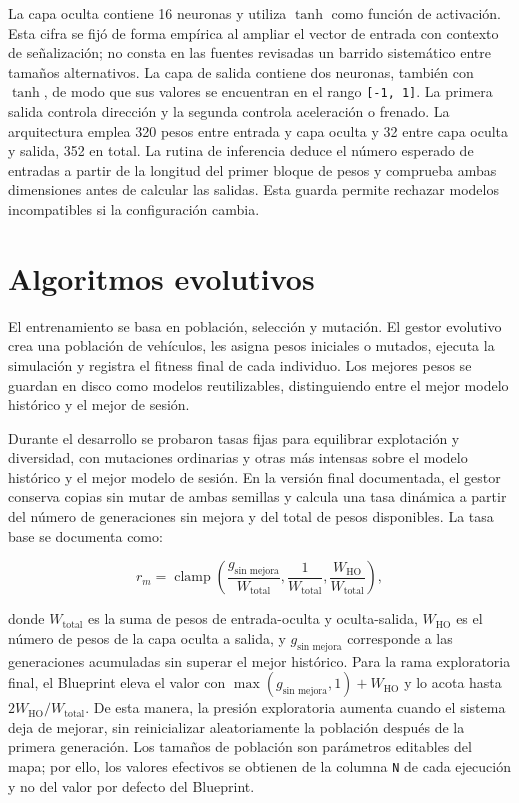La capa oculta contiene 16 neuronas y utiliza \(\tanh\) como función de activación. Esta cifra se fijó de forma empírica al ampliar el vector de entrada con contexto de señalización; no consta en las fuentes revisadas un barrido sistemático entre tamaños alternativos. La capa de salida contiene dos neuronas, también con \(\tanh\), de modo que sus valores se encuentran en el rango \texttt{[-1, 1]}. La primera salida controla dirección y la segunda controla aceleración o frenado. La arquitectura emplea 320 pesos entre entrada y capa oculta y 32 entre capa oculta y salida, 352 en total. La rutina de inferencia deduce el número esperado de entradas a partir de la longitud del primer bloque de pesos y comprueba ambas dimensiones antes de calcular las salidas. Esta guarda permite rechazar modelos incompatibles si la configuración cambia.

\section{Algoritmos evolutivos}

El entrenamiento se basa en población, selección y mutación. El gestor evolutivo crea una población de vehículos, les asigna pesos iniciales o mutados, ejecuta la simulación y registra el fitness final de cada individuo. Los mejores pesos se guardan en disco como modelos reutilizables, distinguiendo entre el mejor modelo histórico y el mejor de sesión.

Durante el desarrollo se probaron tasas fijas para equilibrar explotación y diversidad, con mutaciones ordinarias y otras más intensas sobre el modelo histórico y el mejor modelo de sesión. En la versión final documentada, el gestor conserva copias sin mutar de ambas semillas y calcula una tasa dinámica a partir del número de generaciones sin mejora y del total de pesos disponibles. La tasa base se documenta como:

\begin{equation}
r_m=\operatorname{clamp}\left(\frac{g_{\text{sin mejora}}}{W_{\text{total}}},\frac{1}{W_{\text{total}}},\frac{W_{\text{HO}}}{W_{\text{total}}}\right),
\end{equation}

donde \(W_{\text{total}}\) es la suma de pesos de entrada-oculta y oculta-salida, \(W_{\text{HO}}\) es el número de pesos de la capa oculta a salida, y \(g_{\text{sin mejora}}\) corresponde a las generaciones acumuladas sin superar el mejor histórico. Para la rama exploratoria final, el Blueprint eleva el valor con \(\max(g_{\text{sin mejora}},1)+W_{\text{HO}}\) y lo acota hasta \(2W_{\text{HO}}/W_{\text{total}}\). De esta manera, la presión exploratoria aumenta cuando el sistema deja de mejorar, sin reinicializar aleatoriamente la población después de la primera generación. Los tamaños de población son parámetros editables del mapa; por ello, los valores efectivos se obtienen de la columna \texttt{N} de cada ejecución y no del valor por defecto del Blueprint.

